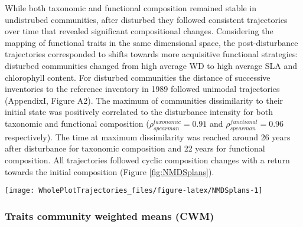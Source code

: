 \documentclass[fleqn,10pt]{ArtEcoFoG} %
\theoremstyle{definition}
\theoremstyle{definition}
\theoremstyle{definition}
\theoremstyle{remark}
\begin{document}
While both taxonomic and functional composition remained stable in
undistrubed communities, after disturbed they followed consistent
trajectories over time that revealed significant compositional changes.
Considering the mapping of functional traits in the same dimensional
space, the post-disturbance trajectories corresponded to shifts towards
more acquisitive functional strategies: disturbed communities changed
from high average WD to high average SLA and chlorophyll content. For
disturbed communities the distance of successive inventories to the
reference inventory in 1989 followed unimodal trajectories (AppendixI,
Figure A2). The maximum of communities dissimilarity to their initial
state was positively correlated to the disturbance intensity for both
taxonomic and functional composition
(\(\rho_{spearman}^{taxonomic}=0.91\) and
\(\rho_{spearman}^{functional}=0.96\) respectively). The time at maximum
dissimilarity was reached around 26 years after disturbance for
taxonomic composition and 22 years for functional composition. All
trajectories followed cyclic composition changes with a return towards
the initial composition (Figure \ref{fig:NMDSplans}).

\begin{figure*}

{\centering \texttt{[image: WholePlotTrajectories\_files/figure-latex/NMDSplans-1]} 

}

\caption{Trajectories of the plots in terms of flora composition (left panels \textbf{(a)} and \textbf{(c)}) and functional composition (right panels \textbf{(b)} and \textbf{(d)}) regarding the 6 leaf and stem functional traits, the maximum allometric height and seed mass class. Plots trajectories are first represented in the two-dimensional space from the NMDS performed for the 30 years after disturbance based on Bray-Curtis dissimilarity measures between successive inventories (Upper panels \textbf{(a)} and \textbf{(b)}). Then the lower panels (\textbf{(c)} and \textbf{(d)}) represent the euclidean distance to initial condition along the 30 sampled years. Line colors represent the disturbance treatment (green for control, blue for T1,orange for T2 and red for T3). The 0.025 and 0.975 percentile correspond to the variance observed for 50 iteration of the taxonomic uncertainty propagation and functional trait filling processes.}\label{fig:NMDSplans}
\end{figure*}

\subsubsection{Traits community weighted means
(CWM)}\label{traits-community-weighted-means-cwm}
\end{document}
